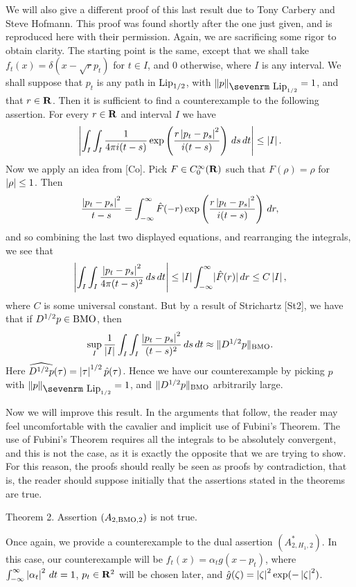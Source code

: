 We will also give a different proof of this last result due
to Tony Carbery and Steve Hofmann.  This proof was found shortly after
the one just given, and is reproduced here with their permission.  
Again, we are sacrificing some rigor to obtain
clarity.
The starting point is the same, except that we shall
take $f_t(x) = \delta(x-\sqrt r p_t)$ for $t\in I$, and $0$ otherwise, 
where $I$ is any 
interval.  We shall suppose that
$p_t$ is any path in $\mathord{\hbox{\rm Lip}}_{1/2}$, with $\normo p_
{\mathord{\hbox{\sevenrm Lip}}_{1/2}} = 1$,
and that $r \in {\bf R}$.  Then it is sufficient to find
a counterexample to the following assertion.  For every $r\in{\bf R}$ and
interval $I$ we have
$$ \left|\int_I \int_I {1\over 4\pi i(t-s)} 
   \exp \left({r \left|p_t-p_s\right|^2
   \over i(t-s)}\right) 
   \, ds \, dt\right| \le \left|I\right| .$$
Now we apply an idea from [Co].
Pick $F\in C^\infty_0({\bf R})$ such that $F(\rho) = \rho$ for $\left|\rho\right|
\le 1$.  Then
$$ {\left|p_t-p_s\right|^2\over t-s} =
   \int_{-\infty}^\infty \hat F(-r) 
   \exp \left({r \left|p_t-p_s\right|^2
   \over i(t-s)}\right) \, dr ,$$
and so combining the last two displayed equations, and rearranging
the integrals, 
we see that
$$ \left|\int_I \int_I {\left|p_t-p_s\right|^2 \over 4\pi (t-s)^2} 
   \, ds \, dt\right| \le \left|I\right| \int_{-\infty}^\infty \mathopen|\hat F(r)\mathclose| \, dr
   \le C \left|I\right| ,$$
where $C$ is some universal constant.  But by a result of Strichartz [St2], 
we have that if $D^{1/2} p \in {\rm BMO}$, then
$$ \sup_I {1\over \left|I\right|} \int_I \int_I
   {\left|p_t-p_s\right|^2 \over (t-s)^2} \, ds \, dt
   \approx
   \mathopen\| D^{1/2} p\mathclose\|_{{\rm BMO}} .$$
Here $\widehat{D^{1/2} p}(\tau) = \left|\tau\right|^{1/2} \hat p(\tau)$.
Hence we have our counterexample by picking $p$ with
$\normo p_{\mathord{\hbox{\sevenrm Lip}}_{1/2}} = 1$, and 
$\mathopen\|D^{1/2} p\mathclose\|_{{\rm BMO}}$ arbitrarily large.

\bigskip

Now we will improve this result.  In the arguments that
follow, the reader may feel uncomfortable with the cavalier
and implicit use of Fubini's Theorem.  The use of Fubini's Theorem
requires all the integrals to be absolutely convergent, and this is not
the case, as it is
exactly the opposite that we are trying to show.  For this reason, the
proofs should really be seen as proofs by contradiction, that is, the
reader should suppose initially that the assertions stated in the theorems
are true.  

\proclaim Theorem 2.  Assertion $(A_{2,{\rm BMO},2})$ is not true.

Once again, we provide a counterexample to the dual 
assertion $(A^*_{2,H_1,2})$.
In this case, our counterexample will be $f_t(x) = \alpha_t g(x-p_t)$, where
$\int_{-\infty}^\infty \left|\alpha_t\right|^2 \, dt = 1$, $p_t \in {\bf R}^2$ will
be chosen later,
and $\hat g(\zeta) = \left|\zeta\right|^2 \exp(-\left|\zeta\right|^2)$.  

